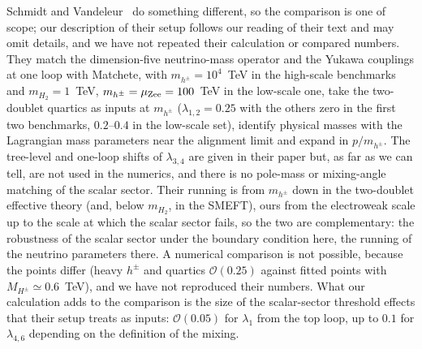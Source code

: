 \documentclass[twocolumn,epjc3]{svjour3}
\begin{document}
Schmidt and Vandeleur~\cite{Schmidt:2025run} do something different, so the comparison is one of scope; our description of their setup follows our reading of their text and may omit details, and we have not repeated their calculation or compared numbers. They match the dimension-five neutrino-mass operator and the Yukawa couplings at one loop with Matchete, with $m_{h^\pm}=10^{4}$~TeV in the high-scale benchmarks and $m_{H_2}=1$~TeV, $m_{h^\pm}=\mu_{\rm Zee}=100$~TeV in the low-scale one, take the two-doublet quartics as inputs at $m_{h^\pm}$ ($\lambda_{1,2}=0.25$ with the others zero in the first two benchmarks, $0.2$--$0.4$ in the low-scale set), identify physical masses with the Lagrangian mass parameters near the alignment limit and expand in $p/m_{h^\pm}$. The tree-level and one-loop shifts of $\lambda_{3,4}$ are given in their paper but, as far as we can tell, are not used in the numerics, and there is no pole-mass or mixing-angle matching of the scalar sector. Their running is from $m_{h^\pm}$ down in the two-doublet effective theory (and, below $m_{H_2}$, in the SMEFT), ours from the electroweak scale up to the scale at which the scalar sector fails, so the two are complementary: the robustness of the scalar sector under the boundary condition here, the running of the neutrino parameters there. A numerical comparison is not possible, because the points differ (heavy $h^\pm$ and quartics $\mathcal O(0.25)$ against fitted points with $M_{H^\pm}\simeq0.6$~TeV), and we have not reproduced their numbers. What our calculation adds to the comparison is the size of the scalar-sector threshold effects that their setup treats as inputs: $\mathcal O(0.05)$ for $\lambda_1$ from the top loop, up to $0.1$ for $\lambda_{4,6}$ depending on the definition of the mixing.
\end{document}
